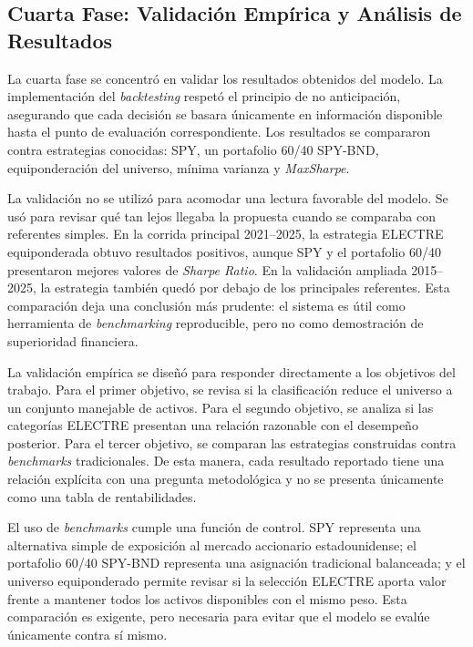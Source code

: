 \documentclass[12pt,letterpaper]{article}
\begin{document}
\subsection{Cuarta Fase: Validación Empírica y Análisis de Resultados}

La cuarta fase se concentró en validar los resultados obtenidos del modelo. La implementación del \textit{backtesting} respetó el principio de no anticipación, asegurando que cada decisión se basara únicamente en información disponible hasta el punto de evaluación correspondiente. Los resultados se compararon contra estrategias conocidas: SPY, un portafolio 60/40 SPY-BND, equiponderación del universo, mínima varianza y \textit{MaxSharpe}.

La validación no se utilizó para acomodar una lectura favorable del modelo. Se usó para revisar qué tan lejos llegaba la propuesta cuando se comparaba con referentes simples. En la corrida principal 2021--2025, la estrategia ELECTRE equiponderada obtuvo resultados positivos, aunque SPY y el portafolio 60/40 presentaron mejores valores de \textit{Sharpe Ratio}. En la validación ampliada 2015--2025, la estrategia también quedó por debajo de los principales referentes. Esta comparación deja una conclusión más prudente: el sistema es útil como herramienta de \textit{benchmarking} reproducible, pero no como demostración de superioridad financiera.

La validación empírica se diseñó para responder directamente a los objetivos del trabajo. Para el primer objetivo, se revisa si la clasificación reduce el universo a un conjunto manejable de activos. Para el segundo objetivo, se analiza si las categorías ELECTRE presentan una relación razonable con el desempeño posterior. Para el tercer objetivo, se comparan las estrategias construidas contra \textit{benchmarks} tradicionales. De esta manera, cada resultado reportado tiene una relación explícita con una pregunta metodológica y no se presenta únicamente como una tabla de rentabilidades.

El uso de \textit{benchmarks} cumple una función de control. SPY representa una alternativa simple de exposición al mercado accionario estadounidense; el portafolio 60/40 SPY-BND representa una asignación tradicional balanceada; y el universo equiponderado permite revisar si la selección ELECTRE aporta valor frente a mantener todos los activos disponibles con el mismo peso. Esta comparación es exigente, pero necesaria para evitar que el modelo se evalúe únicamente contra sí mismo.
\end{document}
